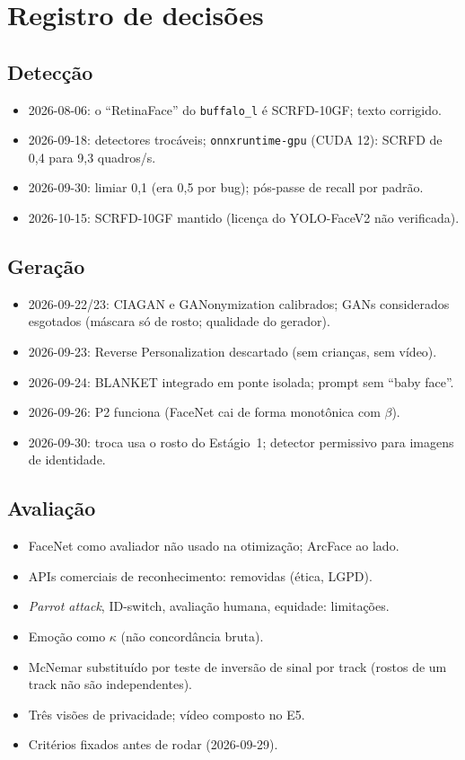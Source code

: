 \chapter{Registro de decisões}
\label{ap:decisoes}


\section{Detecção}
\begin{itemize}
\item 2026-08-06: o ``RetinaFace'' do \texttt{buffalo\_l} é SCRFD-10GF; texto corrigido.
\item 2026-09-18: detectores trocáveis; \texttt{onnxruntime-gpu} (CUDA 12): SCRFD de 0,4 para 9,3 quadros/s.
\item 2026-09-30: limiar 0,1 (era 0,5 por bug); pós-passe de recall por padrão.
\item 2026-10-15: SCRFD-10GF mantido (licença do YOLO-FaceV2 não verificada).
\end{itemize}

\section{Geração}
\begin{itemize}
\item 2026-09-22/23: CIAGAN e GANonymization calibrados; GANs considerados esgotados (máscara só de rosto; qualidade do gerador).
\item 2026-09-23: Reverse Personalization descartado (sem crianças, sem vídeo).
\item 2026-09-24: BLANKET integrado em ponte isolada; prompt sem ``baby face''.
\item 2026-09-26: P2 funciona (FaceNet cai de forma monotônica com $\beta$).
\item 2026-09-30: troca usa o rosto do Estágio~1; detector permissivo para imagens de identidade.
\end{itemize}

\section{Avaliação}
\begin{itemize}
\item FaceNet como avaliador não usado na otimização; ArcFace ao lado.
\item APIs comerciais de reconhecimento: removidas (ética, LGPD).
\item \emph{Parrot attack}, ID-switch, avaliação humana, equidade: limitações.
\item Emoção como $\kappa$ (não concordância bruta).
\item McNemar substituído por teste de inversão de sinal por track (rostos de um track não são independentes).
\item Três visões de privacidade; vídeo composto no E5.
\item Critérios fixados antes de rodar (2026-09-29).
\end{itemize}


